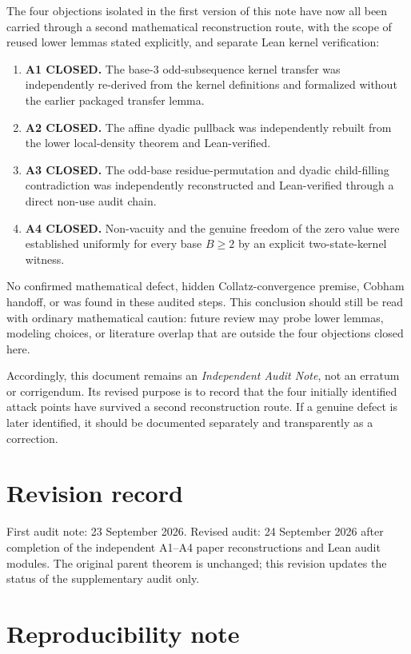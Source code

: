 \documentclass[11pt]{article}
\newcommand{\code}[1]{\path{#1}}
\begin{document}
The four objections isolated in the first version of this note have now all
been carried through a second mathematical reconstruction route, with the
scope of reused lower lemmas stated explicitly, and separate Lean kernel
verification:
\begin{enumerate}[label=\arabic*.]
\item \textbf{A1 CLOSED.}  The base-$3$ odd-subsequence kernel transfer was
      independently re-derived from the kernel definitions and formalized
      without the earlier packaged transfer lemma.
\item \textbf{A2 CLOSED.}  The affine dyadic pullback was independently rebuilt
      from the lower local-density theorem and Lean-verified.
\item \textbf{A3 CLOSED.}  The odd-base residue-permutation and dyadic
      child-filling contradiction was independently reconstructed and
      Lean-verified through a direct non-use audit chain.
\item \textbf{A4 CLOSED.}  Non-vacuity and the genuine freedom of the zero value
      were established uniformly for every base $B\ge2$ by an explicit
      two-state-kernel witness.
\end{enumerate}

No confirmed mathematical defect, hidden Collatz-convergence premise, Cobham
handoff, or \code{sorryAx} was found in these audited steps.  This conclusion
should still be read with ordinary mathematical caution: future review may
probe lower lemmas, modeling choices, or literature overlap that are outside
the four objections closed here.

Accordingly, this document remains an \emph{Independent Audit Note}, not an
erratum or corrigendum.  Its revised purpose is to record that the four
initially identified attack points have survived a second reconstruction route.
If a genuine defect is later identified, it should be documented separately and
transparently as a correction.
\section*{Revision record}
First audit note: 23 September 2026.  Revised audit: 24 September 2026 after
completion of the independent A1--A4 paper reconstructions and Lean audit
modules.  The original parent theorem is unchanged; this revision updates the
status of the supplementary audit only.

\section*{Reproducibility note}
\end{document}
